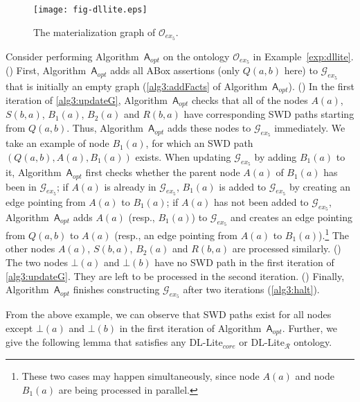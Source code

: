 \begin{figure}[htbp]
\begin{center}
\texttt{[image: fig-dllite.eps]}
\caption{The materialization graph of $\mathcal{O}_{ex_5}$.}
\label{fig:ex2}
\end{center}
\end{figure}

Consider performing Algorithm~$\mathsf{A}_{opt}$ on the ontology $\mathcal{O}_{ex_5}$ in Example~\ref{exp:dllite}.
(\uppercase\expandafter{}) First, Algorithm~$\mathsf{A}_{opt}$ adds all ABox assertions (only $Q(a,b)$ here)
to $\mathcal{G}_{ex_5}$ that is initially an empty graph (\ref{alg3:addFacts} of Algorithm~$\mathsf{A}_{opt}$).
(\uppercase\expandafter{}) In the first iteration of
\ref{alg3:updateG}, Algorithm~$\mathsf{A}_{opt}$ checks that all of the nodes
$A(a)$, $S(b,a)$, $B_1(a)$, $B_2(a)$ and $R(b,a)$ have corresponding SWD paths
starting from $Q(a,b)$. Thus, Algorithm~$\mathsf{A}_{opt}$
adds these nodes to $\mathcal{G}_{ex_5}$ immediately. We take an example of node $B_1(a)$,
for which an SWD path $(Q(a,b),A(a),B_1(a))$ exists.
When updating $\mathcal{G}_{ex_5}$ by adding $B_1(a)$ to it,
Algorithm~$\mathsf{A}_{opt}$ first checks whether the parent node $A(a)$ of $B_1(a)$
has been in $\mathcal{G}_{ex_5}$; if $A(a)$ is already in $\mathcal{G}_{ex_5}$, $B_1(a)$
is added to $\mathcal{G}_{ex_5}$ by creating an edge pointing from $A(a)$ to $B_1(a)$;
if $A(a)$ has not been added to $\mathcal{G}_{ex_5}$, Algorithm~$\mathsf{A}_{opt}$ adds $A(a)$ (resp., $B_1(a)$)
to $\mathcal{G}_{ex_5}$ and creates an edge pointing from $Q(a,b)$ to $A(a)$ (resp.,
an edge pointing from $A(a)$ to $B_1(a)$).\footnote{These two cases may happen simultaneously,
since node $A(a)$ and node $B_1(a)$ are being processed in parallel.} The other nodes
$A(a)$, $S(b,a)$, $B_2(a)$ and $R(b,a)$ are processed similarly.
(\uppercase\expandafter{})
The two nodes $\bot(a)$ and $\bot(b)$
have no SWD path in the first iteration of \ref{alg3:updateG}.
They are left to be processed in the second iteration.
(\uppercase\expandafter{})
Finally, Algorithm~$\mathsf{A}_{opt}$ finishes constructing $\mathcal{G}_{ex_5}$
after two iterations (\ref{alg3:halt}).

From the above example, we can observe that SWD paths exist
for all nodes except $\bot(a)$ and $\bot(b)$ in the first iteration of Algorithm~$\mathsf{A}_{opt}$.
Further, we give the following lemma that satisfies any DL-Lite$_{core}$ or DL-Lite$_\mathcal{R}$ ontology.

